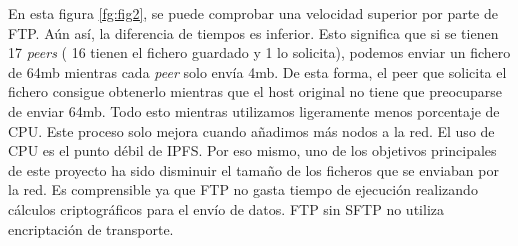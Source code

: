 En esta figura \ref{fg:fig2}, se puede comprobar una velocidad superior por parte de FTP. Aún así, la diferencia de tiempos es inferior. Esto significa que si se tienen 17 \textit{peers} ( 16 tienen el fichero guardado y 1 lo solicita), podemos enviar un fichero de 64mb mientras cada \textit{peer} solo envía 4mb. De esta forma, el peer que solicita el fichero consigue obtenerlo mientras que el host original no tiene que preocuparse de enviar 64mb. Todo esto mientras utilizamos ligeramente menos porcentaje de CPU. Este proceso solo mejora cuando añadimos más nodos a la red. El uso de CPU es el punto débil de IPFS. Por eso mismo, uno de los objetivos principales de este proyecto ha sido disminuir el tamaño de los ficheros que se enviaban por la red. Es comprensible ya que FTP no gasta tiempo de ejecución realizando cálculos criptográficos para el envío de datos. FTP sin SFTP no utiliza encriptación de transporte.
\newpage
\thispagestyle{empty}